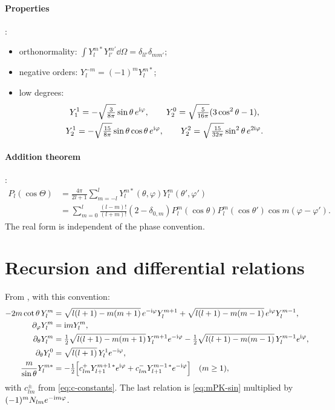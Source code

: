 \paragraph{Properties} \citep[\S5.1]{Varshalovich1988}:
\begin{itemize}
  \item orthonormality: $\int Y_l^{m*}Y_{l'}^{m'}\dd\Omega=\delta_{ll'}\delta_{mm'}$;
  \item negative orders: $Y_l^{-m}=(-1)^mY_l^{m*}$;
  \item low degrees:
  \begin{gather*}
    Y_1^1=-\sqrt{\tfrac{3}{8\pi}}\sin\theta\,e^{\mathrm{i}\varphi},\qquad Y_2^0=\sqrt{\tfrac{5}{16\pi}}(3\cos^2\theta-1),\\
    Y_2^1=-\sqrt{\tfrac{15}{8\pi}}\sin\theta\cos\theta\,e^{\mathrm{i}\varphi},\qquad Y_2^2=\sqrt{\tfrac{15}{32\pi}}\sin^2\theta\,e^{2\mathrm{i}\varphi}.
  \end{gather*}
\end{itemize}

\paragraph{Addition theorem} \citep[eq.~5.17(9)]{Varshalovich1988}:
\begin{align*}
  P_l(\cos\Theta)&=\frac{4\pi}{2l+1}\sum_{m=-l}^lY_l^{m*}(\theta,\varphi)Y_l^m(\theta',\varphi')\\
  &=\sum_{m=0}^l\frac{(l-m)!}{(l+m)!}(2-\delta_{0,m})P_l^m(\cos\theta)P_l^m(\cos\theta')\cos m(\varphi-\varphi').
\end{align*}
The real form is independent of the phase convention.

\section{Recursion and differential relations}
From \citet[\S5.7--5.8]{Varshalovich1988}, with this convention:
\begin{align}
  -2m\cot\theta\,Y_l^m&=\sqrt{l(l+1)-m(m+1)}\,e^{-\mathrm{i}\varphi}Y_l^{m+1}+\sqrt{l(l+1)-m(m-1)}\,e^{\mathrm{i}\varphi}Y_l^{m-1},\\
  \partial_\varphi Y_l^m&=\mathrm{i} mY_l^m,\\
  \partial_\theta Y_l^m&=\tfrac12\sqrt{l(l+1)-m(m+1)}\,Y_l^{m+1}e^{-\mathrm{i}\varphi}-\tfrac12\sqrt{l(l+1)-m(m-1)}\,Y_l^{m-1}e^{\mathrm{i}\varphi},\\
  \partial_\theta Y_l^0&=\sqrt{l(l+1)}\,Y_l^1e^{-\mathrm{i}\varphi},\\
  \frac{m}{\sin\theta}Y_l^{m*}&=-\tfrac12\Big[c^+_{lm}Y_{l+1}^{m+1\,*}e^{\mathrm{i}\varphi}+c^-_{lm}Y_{l+1}^{m-1\,*}e^{-\mathrm{i}\varphi}\Big]\quad(m\ge1),\label{eq:Y-over-sin}
\end{align}
with $c^\pm_{lm}$ from \eqref{eq:c-constants}. The last relation is \eqref{eq:mPK-sin} multiplied by $(-1)^mN_{lm}e^{-\mathrm{i} m\varphi}$.

